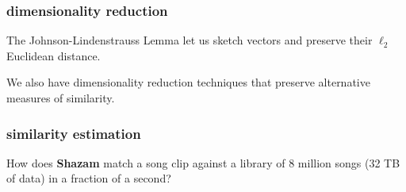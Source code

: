 \documentclass[compress]{beamer}
\begin{document}
%
\begin{frame}
	\frametitle{dimensionality reduction}
	\begin{center}
		The Johnson-Lindenstrauss Lemma let us sketch vectors and preserve their $\ell_2$ Euclidean distance. 
		
		We also have dimensionality reduction techniques that preserve alternative measures of similarity.
	\end{center}
\end{frame}


\begin{frame}
	\frametitle{similarity estimation}
	\begin{center}
			How does \textbf{Shazam} match a song clip against a library of 8 million songs (32 TB of data) in a fraction of a second?
			

\end{center}
\end{frame}
\end{document}
